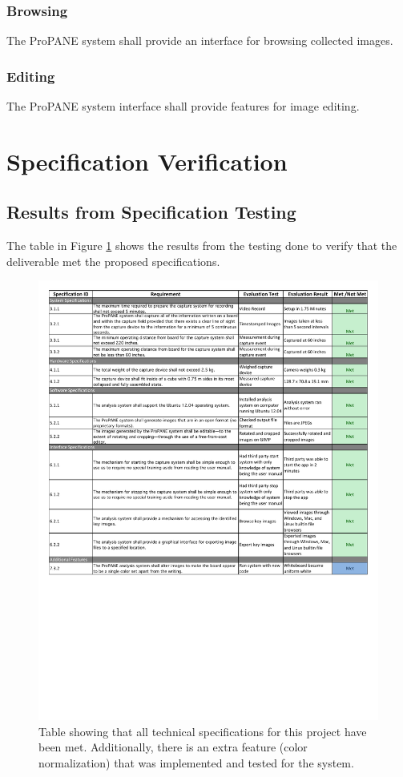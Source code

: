 \documentclass[]{article}
\begin{document}
			\subsubsection{Browsing}
				The ProPANE system shall provide an interface for browsing collected images.
				
			\subsubsection{Editing}
				The ProPANE system interface shall provide features for image editing.
				

	\section{Specification Verification}
	
	
		\subsection{Results from Specification Testing}
			The table in Figure \ref{fig:specreview} shows the results from the testing done to verify that the deliverable met the proposed specifications. 
			
			\begin{figure}
				\centering
				\includegraphics[scale=0.78]{images/technicalspecificationreview.pdf}	
				\caption{Table showing that all technical specifications for this project have been met. Additionally, there is an extra feature (color normalization) that was implemented and tested for the system.}	
				\label{fig:specreview}
			\end{figure}
			
\end{document}
